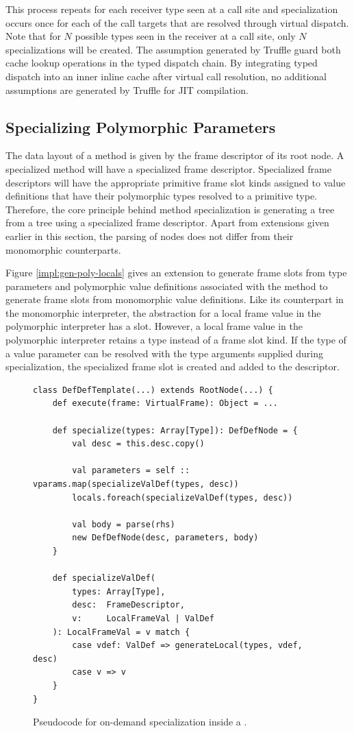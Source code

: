 This process repeats for each receiver type seen at a call site and specialization occurs once for each of the call targets that are resolved through virtual dispatch.
Note that for $N$ possible types seen in the receiver at a call site, only $N$ specializations will be created.
The assumption generated by Truffle guard both cache lookup operations in the typed dispatch chain.
By integrating typed dispatch into an inner inline cache after virtual call resolution, no additional assumptions are generated by Truffle for JIT compilation.

\subsection{Specializing Polymorphic Parameters}

The data layout of a method is given by the frame descriptor of its root node.
A specialized method will have a specialized frame descriptor.
Specialized frame descriptors will have the appropriate primitive frame slot kinds assigned to value definitions that have their polymorphic types resolved to a primitive type.
Therefore, the core principle behind method specialization is generating a  tree from a  tree using a specialized frame descriptor.
Apart from extensions given earlier in this section, the parsing of  nodes does not differ from their monomorphic counterparts.

Figure \ref{impl:gen-poly-locals} gives an extension to generate frame slots from type parameters and polymorphic value definitions associated with the method to generate frame slots from monomorphic value definitions.
Like its counterpart in the monomorphic interpreter, the abstraction for a local frame value in the polymorphic interpreter has a slot.
However, a local frame value in the polymorphic interpreter retains a type instead of a frame slot kind.
If the type of a value parameter can be resolved with the type arguments supplied during specialization, the specialized frame slot is created and added to the descriptor.

\begin{figure}[!htb]
\begin{verbatim}
class DefDefTemplate(...) extends RootNode(...) {
	def execute(frame: VirtualFrame): Object = ...
		
	def specialize(types: Array[Type]): DefDefNode = {
		val desc = this.desc.copy()
			
		val parameters = self :: vparams.map(specializeValDef(types, desc))
		locals.foreach(specializeValDef(types, desc))
			
		val body = parse(rhs)
		new DefDefNode(desc, parameters, body)
	}

	def specializeValDef(
		types: Array[Type], 
		desc:  FrameDescriptor, 
		v:     LocalFrameVal | ValDef
	): LocalFrameVal = v match {
		case vdef: ValDef => generateLocal(types, vdef, desc)
		case v => v
	}
}
\end{verbatim}
\caption{Pseudocode for on-demand specialization inside a .}
\label{impl:defdeftemplate-specialize}
\end{figure}


